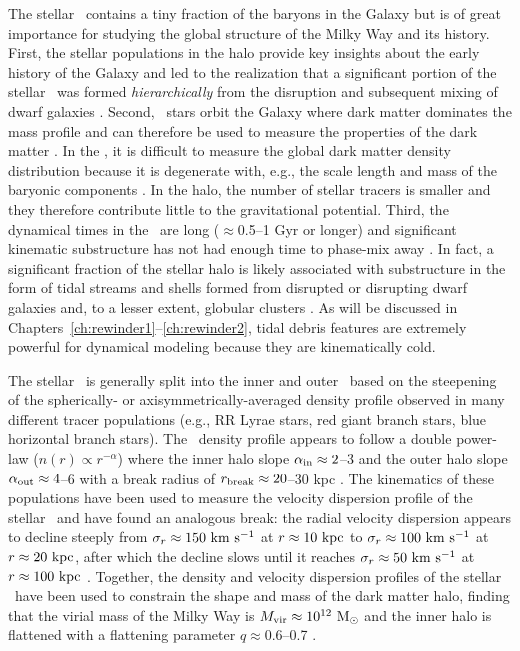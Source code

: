 The stellar \mwhalo\ contains a tiny fraction of the baryons in the Galaxy
\citep[$\approx$1\%;][]{bell08} but is of great importance for studying the
global structure of the Milky Way and its history. First, the stellar
populations in the halo provide key insights about the early history of the
Galaxy and led to the realization that a significant portion of the stellar
\mwhalo\ was formed \emph{hierarchically} from the disruption and subsequent
mixing of dwarf galaxies \citep[e.g.,][]{searle78, bullock05, bell08}. Second,
\mwhalo\ stars orbit the Galaxy where dark matter dominates the mass profile and
can therefore be used to measure the properties of the dark matter \mwhalo. In
the \mwdisk, it is difficult to measure the global dark matter density
distribution because it is degenerate with, e.g., the scale length and mass of
the baryonic components \citep{dehnen98a,sofue09}. In the halo, the number of
stellar tracers is smaller and they therefore contribute little to the
gravitational potential. Third, the dynamical times in the \mwhalo\ are long
($\approx$0.5--1 Gyr or longer) and significant kinematic substructure has not
had enough time to phase-mix away \citep{helmi99}. In fact, a significant
fraction \citep[$\approx$40--50\%;][]{bell08} of the stellar halo is likely
associated with substructure in the form of tidal streams and shells formed from
disrupted or disrupting dwarf galaxies and, to a lesser extent, globular
clusters \citep[e.g.,][]{newberg02,majewski03,belokurov06}. As will be discussed
in Chapters~\ref{ch:rewinder1}--\ref{ch:rewinder2}, tidal debris features are
extremely powerful for dynamical modeling because they are kinematically cold.

The stellar \mwhalo\ is generally split into the inner and outer \mwhalo\ based
on the steepening of the spherically- or axisymmetrically-averaged density
profile observed in many different tracer populations (e.g., RR Lyrae stars, red
giant branch stars, blue horizontal branch stars). The \mwhalo\ density profile
appears to follow a double power-law ($n(r) \propto r^{-\alpha}$) where the
inner halo slope $\alpha_{\rm in} \approx 2$--3 and the outer halo slope
$\alpha_{\rm out} \approx 4$--6 with a break radius of $r_{\rm break} \approx
20$--30 kpc \citep{watkins09, sesar10, deason11, sesar11, sesar13a}. The
kinematics of these populations have been used to measure the velocity
dispersion profile of the stellar \mwhalo\ and have found an analogous
break: the radial velocity dispersion appears to decline steeply from
$\sigma_r \approx 150~\mathrm{km}~\mathrm{s}^{-1}$ at $r\approx10~\mathrm{kpc}$ to $\sigma_r \approx 100~\mathrm{km}~\mathrm{s}^{-1}$
at $r\approx20~\mathrm{kpc}$, after which the decline slows until it reaches $\sigma_r
\approx 50~\mathrm{km}~\mathrm{s}^{-1}$ at $r\approx100~\mathrm{kpc}$ \citep{battaglia05, xue08, brown10,
deason12b, deason13}. Together, the density and velocity dispersion profiles of
the stellar \mwhalo\ have been used to constrain the shape and mass of the dark
matter halo, finding that the virial mass of the Milky Way is $M_{\rm vir}
\approx 10^{12}~\mathrm{M}_\odot$ and the inner halo is flattened with a flattening
parameter $q \approx 0.6$--0.7 \citep{sesar11, deason11, sesar13a, xue15}.

